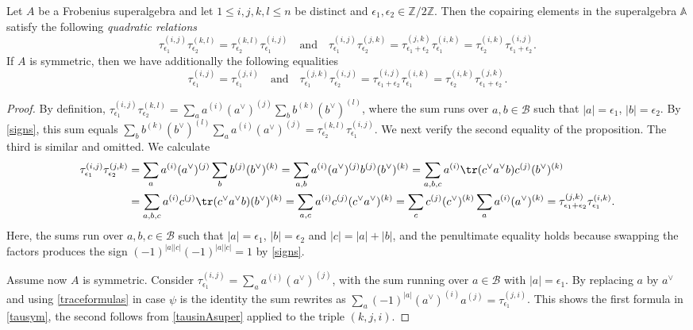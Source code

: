 \documentclass[a4paper,11pt]{amsart}
\newcommand\cB{\mathcal{B}}
\numberwithin{equation}{subsection}
\theoremstyle{definition}
\theoremstyle{theorem}
\theoremstyle{remark}
\newcommand\Ztwo{\mathbb{Z}/2\mathbb{Z}}
\newcommand{\epso}{{\epsilon_1}}
\newcommand{\epsoo}{{\epsilon_2}}
\newcommand{\Ao}{\mathbb{A}}
\begin{document}
  \begin{Proposition}\label{Taussuper}
   Let $A$ be a Frobenius superalgebra and let  $1\leq i,j,k,l\leq n$ be distinct and $\epso, \epsoo\in\Ztwo.$ Then the copairing elements in the superalgebra $\Ao$  satisfy the following \emph{quadratic relations}
 \begin{equation}\label{tausinAsuper}
   \tau_{\epso}^{(i,j)}\tau^{(k,l)}_{\epsoo}=\tau^{(k,l)}_{\epsoo}\tau^{(i,j)}_{\epso}
   \quad\text{and}\quad
    \tau_{\epso}^{(i,j)}\tau_{\epsoo}^{(j,k)}=\tau^{(j,k)}_{\epso+\epsoo}\tau^{(i,k)}_{\epso}=\tau^{(i,k)}_{\epsoo}\tau^{(i,j)}_{\epso+\epsoo}.
 \end{equation}
     If $A$ is symmetric, then we have additionally the following equalities
 \begin{equation}\label{tausym}
  \tau^{(i,j)}_\epso=\tau^{(j,i)}_\epso \quad\text{and}\quad  \tau^{(j,k)}_{\epso}\tau^{(i,j)}_{\epsoo}=\tau^{(i,j)}_{\epso+\epsoo}\tau^{(i,k)}_{\epso}=\tau^{(i,k)}_{\epsoo}\tau^{(j,k)}_{\epso+\epsoo}.
 \end{equation}
 \end{Proposition}
  \begin{proof}
   By definition,
   $\tau^{(i,j)}_{\epso}\tau^{(k,l)}_{\epsoo}=\sum_{a}a^{(i)}(a^\vee)^{(j)}
   \sum_{b} b^{(k)}  (b^\vee)^{(l)}$, where the sum runs over $a,b\in\cB$
   such that $|a|=\epso$, $|b|=\epsoo$. By \autoref{signs}, this sum equals  $\sum_{b} b^{(k)}  (b^\vee)^{(l)}\sum_{a}a^{(i)}(a^\vee)^{(j)}=\tau^{(k,l)}_{\epsoo}\tau^{(i,j)}_{\epso}$. We next verify the second
    equality of the proposition. The third is similar and omitted.  We calculate
    \begin{align*}
      \tau^{(i,j)}_{\epso}\tau^{(j,k)}_{\epsoo}
         & =\sum_{a}a^{(i)}(a^\vee)^{(j)}  \sum_{b} b^{(j)}  (b^\vee)^{(k)}
         =\sum_{a,b}a^{(i)}(a^\vee)^{(j)} b^{(j)}  (b^\vee)^{(k)}
          =\sum_{a,b,c}a^{(i)}\tr(c^\vee a^\vee b) c^{(j)}  (b^\vee)^{(k)}  \\
             & =\sum_{a,b,c}a^{(i)} c^{(j)} \tr(c^\vee a^\vee b) (b^\vee)^{(k)}
           =\sum_{a, c}a^{(i)} c^{(j)} (c^\vee a^\vee)^{(k)}
              = \sum_{c}c^{(j)} (c^\vee)^{(k)} \sum_{a}a^{(i)} (a^\vee)^{(k)}
      =\tau^{(j,k)}_{\epso+\epsoo}\tau^{(i,k)}_{\epso}.
              \end{align*}
            Here, the sums run over $a,b, c\in \cB$ such that
            $|a|=\epso$, $|b|=\epsoo$ and $|c|=|a|+|b|$, and the
            penultimate equality holds because swapping the factors produces the sign $(-1)^{|a||c|}(-1)^{|a||c|}=1$ by \autoref{signs}.

            Assume now $A$ is symmetric. Consider
            $\tau^{(i,j)}_{\epso}=\sum_{a}a^{(i)}(a^\vee)^{(j)}$, with the sum running over $a\in\cB$ with $|a|=\epso$.
            By replacing $a$ by $a^\vee$ and using \autoref{traceformulas} in case $\psi$ is the identity the sum rewrites as $\sum_{a}(-1)^{|a|}(a^\vee)^{(i)}a^{(j)}=\tau^{(j,i)}_{\epso}$. This shows the first formula in \autoref{tausym}, the second follows from  \autoref{tausinAsuper} applied to the triple $(k,j,i)$.
 \end{proof}
\end{document}

